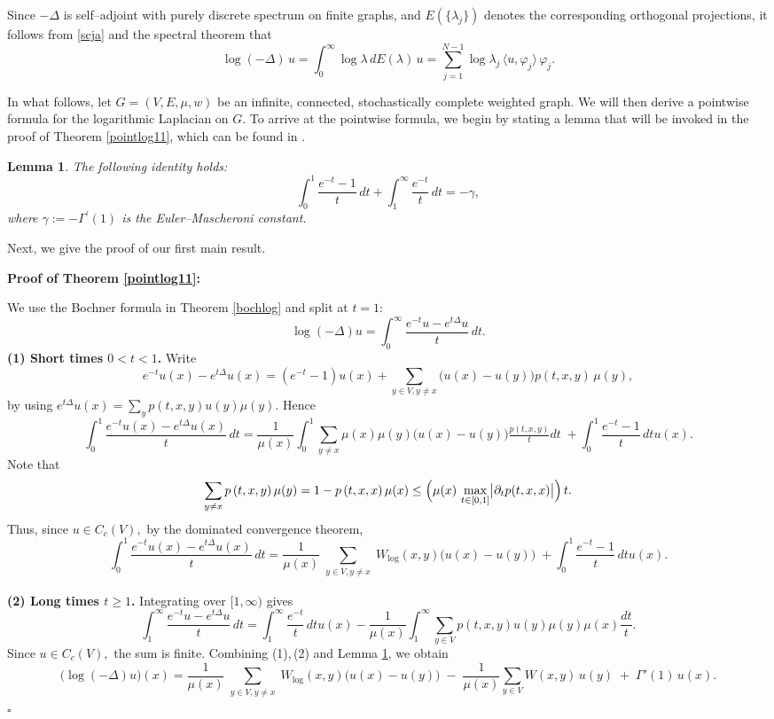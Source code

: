 \documentclass[reqno,12pt]{amsart}
\numberwithin{equation}{section}
\newtheorem{lemma}[theorem]{Lemma}
\begin{document}
Since $-\Delta$ is self–adjoint with purely discrete spectrum  on finite graphs, and $E(\{\lambda_j\})$ denotes the corresponding orthogonal projections, it follows from \eqref{scja} and the spectral theorem that
\[
\log(-\Delta)\,u
=\int_{0}^{\infty}\log\lambda\,dE(\lambda)\,u
=\sum_{j=1}^{N-1}\log\lambda_{j}\,\langle u,\varphi_{j}\rangle\,\varphi_{j}.
\]

In what follows, let $G=(V,E,\mu,w)$ be an infinite, connected, stochastically complete weighted graph. We will then derive a pointwise formula for the logarithmic Laplacian on $G$. To arrive at the pointwise formula, we begin by stating a lemma that will be invoked in the proof of Theorem \ref{pointlog11}, which can be found in \cite{chen2025logarithmic}.


\begin{lemma}\label{euler}
	The following identity holds:
	\[
	\int_{0}^{1}\frac{e^{-t}-1}{t}\,dt
	+\int_{1}^{\infty}\frac{e^{-t}}{t}\,dt
	=-\gamma,
	\]
	where \(\gamma:=-\Gamma^{\prime}(1)\) is the Euler–Mascheroni constant.
\end{lemma}




Next, we give the proof of our first main result.
		
		\vspace{1\baselineskip}
\noindent \textbf{Proof of Theorem \ref{pointlog11}:}
	
	We use the Bochner formula in Theorem \ref{bochlog} and split at \(t=1\):
	\[
	\log(-\Delta)u
	=\int_{0}^{\infty}\frac{e^{-t}u - e^{t\Delta}u}{t}\,dt.
	\]
	\textbf{(1) Short times \(0<t<1\).}  Write
	\[
	e^{-t}u(x)-e^{t\Delta}u(x)
	=(e^{-t}-1)u(x)
	+\sum_{y\in V,y\ne x}\bigl(u(x)-u(y)\bigr)p(t,x,y)\,\mu(y),
	\]
	by using \(e^{t\Delta}u(x)=\sum_y p(t,x,y)u(y)\mu(y)\).  Hence
\begingroup\small		\[
	\int_0^1\frac{e^{-t}u(x)-e^{t\Delta}u(x)}{t}\,dt
	=\frac{1}{\mu(x)}\int_0^1 \sum_{y\neq x}
	\mu(x)\mu(y)\bigl(u(x)-u(y)\bigr) \tfrac{p(t,x,y)}{t}dt
	\;+\int_0^1\frac{e^{-t}-1}{t}\,dt u(x).
	\]\endgroup
	Note that
	\[\sum_{y\ne x}p\left(t,x,y\right)\mu(y)=1-p\left(t,x,x\right)\mu(x)\le \Bigl(\mu(x)\,\max_{t\in[0,1]}\bigl|\partial_{t}p(t,x,x)\bigr|\Bigr)\,t.\]
	Thus, since $u\in C_c\left(V\right),$ by the dominated convergence theorem,
	\[
	\int_0^1\frac{e^{-t}u(x)-e^{t\Delta}u(x)}{t}\,dt
	= \frac{1}{\mu(x)}\sum_{\substack{y\in V,y\neq x}}
	W_{\log}(x,y)\bigl(u(x)-u(y)\bigr)
	\;+\int_0^1\frac{e^{-t}-1}{t}\,dt u(x).
	\]
	
	\medskip\noindent
	\textbf{(2) Long times \(t\ge1\).}  
	Integrating over \([1,\infty)\) gives
	\[
	\int_1^\infty\frac{e^{-t}u-e^{t\Delta}u}{t}\,dt
	=\int_1^\infty\frac{e^{-t}}{t}\,dtu(x)-\frac{1}{\mu\left(x\right)}\int_1^\infty \sum_{y\in V}p(t,x,y)u(y)\mu(y)\mu(x)\frac{dt}{t} .
	\]
Since $u\in C_c\left(V\right),$ the sum is finite. Combining (1),\,(2) and Lemma \ref{euler}, we obtain
\begingroup\small	\[
\bigl(\log(-\Delta)u\bigr)(x)
=\frac{1}{\mu(x)}\sum_{\substack{y\in V,y\neq x}}
W_{\log}(x,y)\bigl(u(x)-u(y)\bigr)
\;-\;\frac{1}{\mu(x)}\sum_{y\in V}W(x,y)\,u(y)
\;+\;\Gamma'(1)\,u(x).
\] \endgroup
 \hfill $\square$
\end{document}
